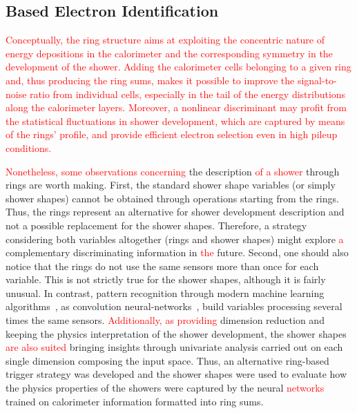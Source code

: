 \subsection{\rnn{} Based Electron Identification}\label{ssec:rings_concept}



\textcolor{red}{Conceptually, the ring structure aims at exploiting the concentric nature of energy depositions in the calorimeter and the corresponding symmetry in the development of the shower.  Adding the calorimeter cells belonging to a given ring and, thus producing the ring sums, makes it possible to improve the signal-to-noise ratio from individual cells, especially in the tail of the energy distributions along the calorimeter layers.  Moreover, a nonlinear discriminant may profit from the statistical fluctuations in shower development, which are captured by means of the rings' profile, and provide efficient electron selection even in high pileup conditions.}


\textcolor{red}{Nonetheless, some observations concerning} the description \textcolor{red}{of a shower} through rings are
worth making. First, the standard shower shape variables (or simply shower shapes) cannot be obtained through operations starting from the rings.  Thus, the rings represent an alternative for shower development description and not a possible replacement for the shower shapes.  Therefore, a strategy considering both variables altogether (rings and shower shapes) might explore \textcolor{red}{a} complementary discriminating information in \textcolor{red}{the} future.
Second, one should also notice
that the rings do not use the same sensors more than once for each variable.
This is not strictly true for the shower shapes, although it is fairly unusual.
In contrast, pattern recognition through modern machine learning
algorithms~\cite{Engelbrecht2007,Goodfellow2016}, as convolution
neural-networks~\cite{Gu2018}, build variables processing several times
the same sensors. \textcolor{red}{Additionally, as providing} dimension reduction and keeping the
physics interpretation of the shower development, the shower shapes \textcolor{red}{are also suited} bringing insights through univariate analysis carried out on each
single dimension composing the input space.
Thus, an alternative ring-based trigger strategy was developed and the shower shapes were used to evaluate how the physics properties of the showers were captured by the neural \textcolor{red}{networks} trained on calorimeter information formatted into ring sums. 





